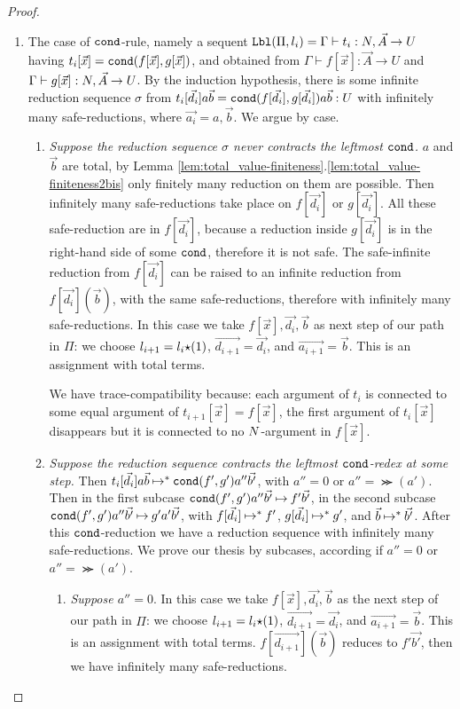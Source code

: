 \begin{proof}
\begin{enumerate}

\item
  The case of ${\tt cond}$-rule, namely a sequent
  ${\tt Lbl}(\Pi,l_i) = \Gamma\vdash t_i:{N},\vec{A}\rightarrow U$
  having $t_i[\vec{x}] = {\tt cond}(f[\vec{x}],g[\vec{x}])$,
  and obtained from 
  $\Gamma\vdash f[\vec{x}]:\vec{A}\rightarrow U$
  and
  $\Gamma\vdash g[\vec{x}]:{N},\vec{A}\rightarrow U$. 
  By the induction hypothesis, there is some infinite reduction sequence $\sigma$ from
  $t_i[\vec{d_i}]a \vec{b} = {\tt cond}(f[\vec{d_i}],g[\vec{d_i}])a\vec{b}: U$
  with infinitely many safe-reductions,
  where $\vec{a_i} = a,\vec{b}$. 
  We argue by case.
\begin{enumerate}
\item
  \emph{Suppose the reduction sequence $\sigma$ never contracts the leftmost ${\tt cond}$.}
  $a$ and $\vec{b}$ are total, 
  by Lemma \ref{lem:total_value-finiteness}.\ref{lem:total_value-finiteness2bis}
  only finitely many reduction on them are possible.
  Then infinitely many safe-reductions take place on $f[\vec{d_i}]$ or $g[\vec{d_i}]$. 
  All these safe-reduction are in $f[\vec{d_i}]$, because
  a reduction inside $g[\vec{d_i}]$ is in the right-hand side of some ${\tt cond}$, 
  therefore it is not safe.
  The safe-infinite reduction from $f[\vec{d_i}]$ can be raised to an infinite reduction from 
  $f[\vec{d_i}](\vec{b})$, with the same safe-reductions, therefore with infinitely
  many safe-reductions.
  In this case we take $f[\vec{x}],\vec{d_i},\vec{b}$ as next step of our path in $\Pi$:
  we choose $l_{i+1} = l_i {\star} (1)$, $\vec{d_{i+1}} = \vec{d_i}$, and
  $\vec{a_{i+1}} = \vec{b}$.  This is an assignment with total terms.

  We have trace-compatibility because: 
  each argument of $t_i$ is connected to some equal argument of 
  $t_{i+1}[\vec{x}]=f[\vec{x}]$,
  the first argument of $t_i[\vec{x}]$ disappears 
  but it is connected to no ${N}$-argument in $f[\vec{x}]$.

\item
  \emph{Suppose the reduction sequence contracts the leftmost ${\tt cond}$-redex at some step.}
  Then $t_i[\vec{d_i}]a \vec{b} \mathbin{\mapsto}^{*} {\tt cond}(f',g')a''\vec{b'}$, 
  with $a'' = 0$ or $a'' = \Succ(a')$. 
  Then in the first subcase ${\tt cond}(f',g')a''\vec{b'} \mathbin{\mapsto} f'\vec{b'}$, in the second subcase
  ${\tt cond}(f',g')a''\vec{b'} \mathbin{\mapsto} g' a' \vec{b'}$, 
  with $f[\vec{d_i}] \mathbin{\mapsto}^{*} f'$, $g[\vec{d_i}] \mathbin{\mapsto}^{*} g'$, 
  and $\vec{b} \mathbin{\mapsto}^{*} \vec{b'}$.
  After this ${\tt cond}$-reduction we have a reduction sequence 
  with infinitely many safe-reductions.
  We prove our thesis by subcases, according if $a'' = 0$ or $a'' = \Succ(a')$.
\begin{enumerate}
\item
  \emph{Suppose $a'' = 0$}.
   In this case we take $f[\vec{x}],\vec{d_i},\vec{b}$ as the next step of our path in $\Pi$:
  we choose $l_{i+1} = l_i {\star} (1)$, $\vec{d_{i+1}} = \vec{d_i}$, 
  and $\vec{a_{i+1}} = \vec{b}$. 
  This is an assignment with total terms.
  $f[\vec{d_{i+1}}](\vec{b})$ reduces to $f' \vec{b'}$, 
  then we have infinitely many safe-reductions.


\end{enumerate}
\end{enumerate}
\end{enumerate}
\end{proof}
